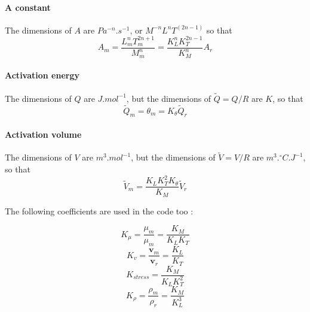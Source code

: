\paragraph{A constant} The dimensions of $A$ are $Pa^{-n}.s^{-1}$, or $M^{-n} L^n T^{(2n-1)}$ so that
\[
A_m = \frac{L_m^n T_m^{2n+1}   }{M_m^n } = \frac{K_L^n K_T^{2n-1}  }{K_M^n } A_r
\]

\paragraph{Activation energy} The dimensions of $Q$ are $J.mol^{-1}$, but the dimensions of $\tilde{Q}=Q/R$ are $K$, so that
\[
\tilde{Q}_m = \theta_m = K_\theta \tilde{Q}_r
\]

\paragraph{Activation volume} The dimensions of $V$ are $m^3.mol^{-1}$, but the dimensions of $\tilde{V}=V/R$ are $m^3.^\circ C.J^{-1}$, so that
\[
\tilde{V}_m = \frac{K_L K_T^2 K_\theta}{K_M } \tilde{V}_r 
\]


The following coefficients are used in the code too :

\[
K_\mu = \frac{\mu_m}{\mu_m} = \frac{K_M}{K_LK_T}
\]
\[
K_{v} =\frac{  {\bm v}_m  }{ {\bm v}_r } = \frac{K_L}{K_T} 
\]
\[
K_{stress} = \frac{K_M}{K_LK_T^2}
\]
\[
K_\rho = \frac{\rho_m}{\rho_r} = \frac{K_M}{K_L^3}
\]





